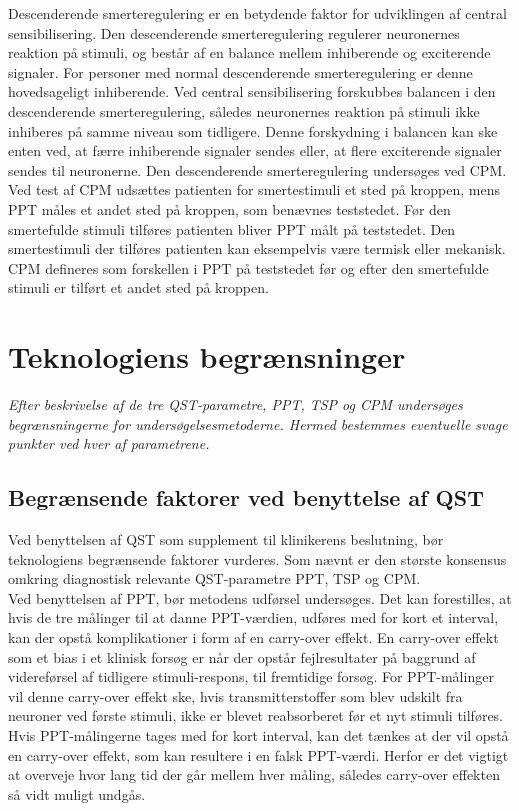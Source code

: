 Descenderende smerteregulering er en betydende faktor for udviklingen af central sensibilisering. Den descenderende smerteregulering regulerer neuronernes reaktion på stimuli, og består af en balance mellem inhiberende og exciterende signaler. For personer med normal descenderende smerteregulering er denne hovedsageligt inhiberende. Ved central sensibilisering forskubbes balancen i den descenderende smerteregulering, således neuronernes reaktion på stimuli ikke inhiberes på samme niveau som tidligere. Denne forskydning i balancen kan ske enten ved, at færre inhiberende signaler sendes eller, at flere exciterende signaler sendes til neuronerne. \citep{Arendt-Nielsen2015b} Den descenderende smerteregulering undersøges ved CPM. Ved test af CPM udsættes patienten for smertestimuli et sted på kroppen, mens PPT måles et andet sted på kroppen, som benævnes teststedet. Før den smertefulde stimuli tilføres patienten bliver PPT målt på teststedet. \citep{Petersen2016} Den smertestimuli der tilføres patienten kan eksempelvis være termisk eller mekanisk. CPM defineres som forskellen i PPT på teststedet før og efter den smertefulde stimuli er tilført et andet sted på kroppen. \citep{Petersen2015} 

\section{Teknologiens begrænsninger}
\textit{Efter beskrivelse af de tre QST-parametre, PPT, TSP og CPM undersøges begrænsningerne for undersøgelsesmetoderne. Hermed bestemmes eventuelle svage punkter ved hver af parametrene.}

\subsection{Begrænsende faktorer ved benyttelse af QST}
Ved benyttelsen af QST som supplement til klinikerens beslutning, bør teknologiens begrænsende faktorer vurderes. Som nævnt er den største konsensus omkring diagnostisk relevante QST-parametre PPT, TSP og CPM. \\
Ved benyttelsen af PPT, bør metodens udførsel undersøges. Det kan forestilles, at hvis de tre målinger til at danne PPT-værdien, udføres med for kort et interval, kan der opstå komplikationer i form af en carry-over effekt. En carry-over effekt som et bias i et klinisk forsøg er når der opstår fejlresultater på baggrund af videreførsel af tidligere stimuli-respons, til fremtidige forsøg. For PPT-målinger vil denne carry-over effekt ske, hvis transmitterstoffer som blev udskilt fra neuroner ved første stimuli, ikke er blevet reabsorberet før et nyt stimuli tilføres. \citep{Martini2012} Hvis PPT-målingerne tages med for kort interval, kan det tænkes at der vil opstå en carry-over effekt, som kan resultere i en falsk PPT-værdi. Herfor er det vigtigt at overveje hvor lang tid der går mellem hver måling, således carry-over effekten så vidt muligt undgås. \citep{Porta2008} 

